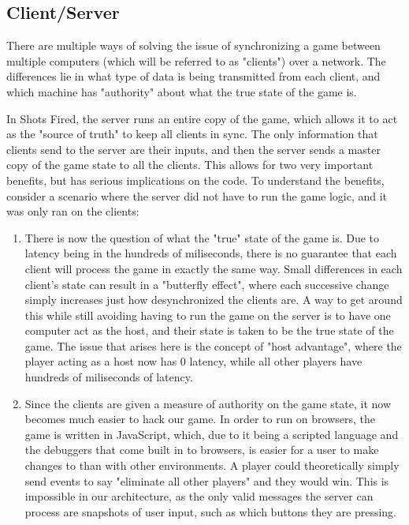 \documentclass[12pt]{report}
\begin{document}
\subsection{Client/Server}
There are multiple ways of solving the issue of synchronizing a game between
multiple computers (which will be referred to as "clients") over a network.  The
differences lie in what type of data is being transmitted from each client, and
which machine has "authority" about what the true state of the game is.

In Shots Fired, the server runs an entire copy of the game, which allows it to
act as the "source of truth" to keep all clients in sync.  The only information
that clients send to the server are their inputs, and then the server sends a
master copy of the game state to all the clients.  This allows for two very
important benefits, but has serious implications on the code.  To understand the
benefits, consider a scenario where the server did not have to run the game
logic, and it was only ran on the clients:  
\begin{enumerate}
    \item There is now the question of what the "true" state of the game is.
        Due to latency being in the hundreds of miliseconds, there is no
        guarantee that each client will process the game in exactly the same
        way.  Small differences in each client's state can result in a
        "butterfly effect", where each successive change simply increases just
        how desynchronized the clients are.  A way to get around this while
        still avoiding having to run the game on the server is to have one
        computer act as the host, and their state is taken to be the true state
        of the game.  The issue that arises here is the concept of "host
        advantage", where the player acting as a host now has 0 latency, while
        all other players have hundreds of miliseconds of latency.  
    \item Since the clients are given a measure of authority on the game state,
        it now becomes much easier to hack our game.  In order to run on
        browsers, the game is written in JavaScript, which, due to it being a
        scripted language and the debuggers that come built in to browsers, is
        easier for a user to make changes to than with other environments.  A
        player could theoretically simply send events to say "eliminate all
        other players" and they would win.  This is impossible in our
        architecture, as the only valid messages the server can process are
        snapshots of user input, such as which buttons they are pressing.
\end{enumerate}
\end{document}
